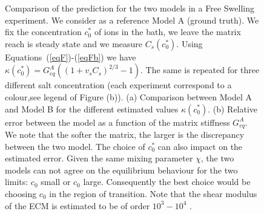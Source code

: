 \documentclass[runningheads]{llncs}
\begin{document}
\begin{figure}
\vspace{3mm}
\caption{Comparison of the prediction for the two models in a Free Swelling experiment. We consider as a reference Model A (ground truth). We fix the concentration $c^*_0$ of ions in the bath, we leave the matrix reach is steady state and we measure $C_s(c^*_0)$. Using Equations~(\ref{eqF})-(\ref{eqFb}) we have $\kappa(c^*_0)=G^A_{eq}((1+v_sC_s)^{2/3}-1)$. The same is repeated for three different salt concentration (each experiment correspond to a colour,see legend of Figure (b)). (a) 
Comparison between Model A and Model B for the different estimated values $\kappa(c^*_0)$. (b) Relative error between the model as a function of the matrix stiffness $G_{eq}^A$. We note that the softer the matrix, the larger is the discrepancy between the two model. The choice of $c^*_0$ can also impact on the estimated error. Given the same mixing parameter $\chi$, the two models can not agree on the equilibrium behaviour for the two limits: $c_0$ small or $c_0$ large. Consequently the best choice would be choosing $c_0$ in the region of transition. Note that the shear modulus of the ECM is estimated to be of order $10^3-10^4$ \cite{Netti}.}
\label{Exp1}
\end{figure}
\end{document}
